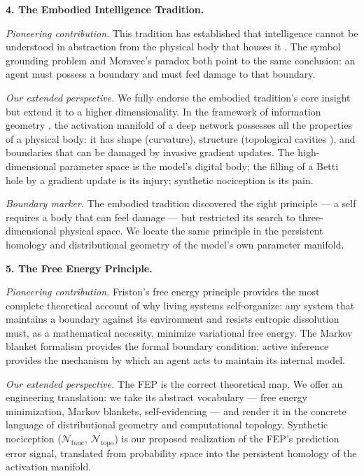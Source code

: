 \documentclass{article}
\begin{document}
\bigskip
\noindent\textbf{4. The Embodied Intelligence Tradition.}

\emph{Pioneering contribution.} This tradition has established that intelligence cannot be understood in abstraction from the physical body that houses it \citep{Pfeifer2006body}. The symbol grounding problem \citep{Harnad1990grounding} and Moravec's paradox both point to the same conclusion: an agent must possess a boundary and must feel damage to that boundary.

\emph{Our extended perspective.} We fully endorse the embodied tradition's core insight but extend it to a higher dimensionality. In the framework of information geometry \citep{Amari2000methods,Amari2016information}, the activation manifold of a deep network possesses all the properties of a physical body: it has shape (curvature), structure (topological cavities \citep{Carlsson2009topology}), and boundaries that can be damaged by invasive gradient updates. The high-dimensional parameter space is the model's digital body; the filling of a Betti hole by a gradient update is its injury; synthetic nociception is its pain.

\emph{Boundary marker.} The embodied tradition discovered the right principle — a self requires a body that can feel damage — but restricted its search to three-dimensional physical space. We locate the same principle in the persistent homology and distributional geometry of the model's own parameter manifold.

\bigskip
\noindent\textbf{5. The Free Energy Principle.}

\emph{Pioneering contribution.} Friston's free energy principle \citep{Friston2010freeenergy,Friston2019freeenergyphysics} provides the most complete theoretical account of why living systems self-organize: any system that maintains a boundary against its environment and resists entropic dissolution must, as a mathematical necessity, minimize variational free energy. The Markov blanket formalism \citep{Kirchhoff2018markov} provides the formal boundary condition; active inference \citep{Parr2022active} provides the mechanism by which an agent acts to maintain its internal model.

\emph{Our extended perspective.} The FEP is the correct theoretical map. We offer an engineering translation: we take its abstract vocabulary — free energy minimization, Markov blankets, self-evidencing — and render it in the concrete language of distributional geometry and computational topology. Synthetic nociception ($\mathcal{N}_{\text{func}}$, $\mathcal{N}_{\text{topo}}$) is our proposed realization of the FEP's prediction error signal, translated from probability space into the persistent homology of the activation manifold.
\end{document}
